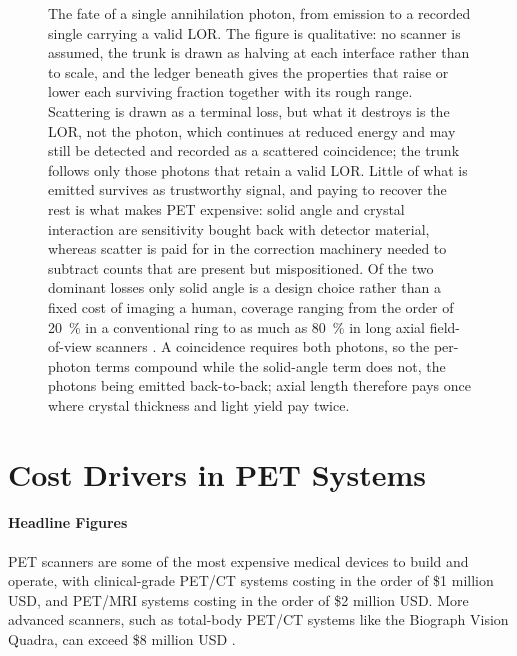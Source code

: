 \begin{figure}[p]
	\centering
	
	\caption[What governs the fate of an annihilation photon]{%
		The fate of a single  annihilation photon, from emission to a recorded single carrying a valid LOR.
		The figure is qualitative: no scanner is assumed, the trunk is drawn as halving at each interface rather than to scale, and the ledger beneath gives the properties that raise or lower each surviving fraction together with its rough range.
		Scattering is drawn as a terminal loss, but what it destroys is the LOR, not the photon, which continues at reduced energy and may still be detected and recorded as a scattered coincidence; the trunk follows only those photons that retain a valid LOR.
		Little of what is emitted survives as trustworthy signal, and paying to recover the rest is what makes PET expensive: solid angle and crystal interaction are sensitivity bought back with detector material, whereas scatter is paid for in the correction machinery needed to subtract counts that are present but mispositioned.
		Of the two dominant losses only solid angle is a design choice rather than a fixed cost of imaging a human, coverage ranging from the order of \qty{20}{\percent} in a conventional ring to as much as \qty{80}{\percent} in long axial field-of-view scanners \cite{Vandenberghe2020}.
		A coincidence requires both photons, so the per-photon terms compound while the solid-angle term does not, the photons being emitted back-to-back; axial length therefore pays once where crystal thickness and light yield pay twice.}
	\label{fig:photon-flow}
\end{figure}

\section{Cost Drivers in PET Systems}

\paragraph{Headline Figures}
PET scanners are some of the most expensive medical devices to build and operate, with clinical-grade PET/CT systems costing in the order of \$1 million USD, and PET/MRI systems costing in the order of \$2 million USD.
More advanced scanners, such as total-body PET/CT systems like the Biograph Vision Quadra, can exceed \$8 million USD \cite{slhd2021quadra}.
